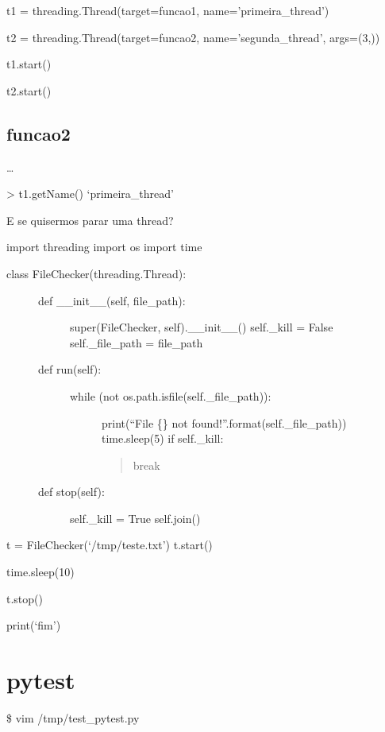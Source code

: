 \documentclass[letterpaper,10pt,brazil]{sphinxmanual}
\begin{document}
t1 = threading.Thread(target=funcao1, name=’primeira\_thread’)

t2 = threading.Thread(target=funcao2, name=’segunda\_thread’, args=(3,))

t1.start()

t2.start()


\section{funcao2}
\label{\detokenize{content/threads:funcao2}}
…

\textgreater{} t1.getName()
‘primeira\_thread’

E se quisermos parar uma thread?

import threading
import os
import time
\begin{description}
\item[{class FileChecker(threading.Thread):}] \leavevmode\begin{description}
\item[{def \_\_init\_\_(self, file\_path):}] \leavevmode
super(FileChecker, self).\_\_init\_\_()
self.\_kill = False
self.\_file\_path = file\_path

\item[{def run(self):}] \leavevmode\begin{description}
\item[{while (not os.path.isfile(self.\_file\_path)):}] \leavevmode
print(“File \{\} not found!”.format(self.\_file\_path))
time.sleep(5)
if self.\_kill:
\begin{quote}

break
\end{quote}

\end{description}

\item[{def stop(self):}] \leavevmode
self.\_kill = True
self.join()

\end{description}

\end{description}

t = FileChecker(‘/tmp/teste.txt’)
t.start()

time.sleep(10)

t.stop()

print(‘fim’)


\chapter{pytest}
\label{\detokenize{content/pytest:pytest}}\label{\detokenize{content/pytest::doc}}
\$ vim /tmp/test\_pytest.py
\end{document}
